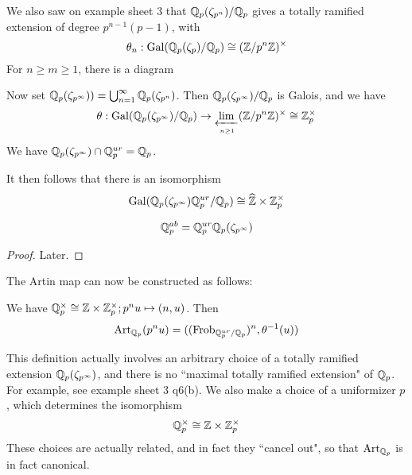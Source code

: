 \documentclass[10pt,a4paper]{article}
\begin{document}
We also saw on example sheet 3 that $\mathbb{Q}_p(\zeta_{p^n})/\mathbb{Q}_p$ gives a totally ramified extension of degree $p^{n-1}(p-1)$, with
\[\theta_n : \operatorname{Gal}(\mathbb{Q}_p(\zeta_p)/\mathbb{Q}_p) \cong (\mathbb{Z}/p^n\mathbb{Z})^\times\]
For $n\geq m\geq 1$, there is a diagram
\begin{center}
\end{center}
Now set $\mathbb{Q}_p(\zeta_{p^\infty})) = \bigcup_{n=1}^\infty \mathbb{Q}_p(\zeta_{p^n})$. Then $\mathbb{Q}_p(\zeta_{p^\infty})/\mathbb{Q}_p$ is Galois, and we have
\[\theta : \operatorname{Gal}(\mathbb{Q}_p(\zeta_{p^\infty})/\mathbb{Q}_p) \to \lim\limits_{\xleftarrow[n\geq 1]{}}(\mathbb{Z}/p^n\mathbb{Z})^\times \cong \mathbb{Z}_p^\times\]
We have $\mathbb{Q}_p(\zeta_{p^\infty}) \cap \mathbb{Q}_p^{ur} = \mathbb{Q}_p$.

It then follows that there is an isomorphism
\[\operatorname{Gal}(\mathbb{Q}_p(\zeta_{p^\infty})\mathbb{Q}_p^{ur}/\mathbb{Q}_p)\cong \widehat{\mathbb{Z}}\times \mathbb{Z}_p^\times\]
\begin{theorem}
  \[\mathbb{Q}_p^{ab} = \mathbb{Q}_p^{ur}\mathbb{Q}_p(\zeta_{p^\infty})\]
\end{theorem}
\begin{proof}
  Later.
\end{proof}
The Artin map can now be constructed as follows:

We have $\mathbb{Q}_p^\times \cong \mathbb{Z}\times \mathbb{Z}_p^\times; p^nu \mapsto (n, u)$. Then
\[\operatorname{Art}_{\mathbb{Q}_p}(p^nu) = ((\operatorname{Frob}_{\mathbb{Q}_p^{ur}/\mathbb{Q}_p})^n, \theta^{-1}(u))\]

This definition actually involves an arbitrary choice of a totally ramified extension $\mathbb{Q}_p(\zeta_{p^\infty})$, and there is no ``maximal totally ramified extension" of $\mathbb{Q}_p$. For example, see example sheet 3 q6(b). We also make a choice of a uniformizer $p$, which determines the isomorphism
\[\mathbb{Q}_p^\times \cong \mathbb{Z}\times \mathbb{Z}_p^\times\]
These choices are actually related, and in fact they ``cancel out", so that $\operatorname{Art}_{\mathbb{Q}_p}$ is in fact canonical.
\end{document}
